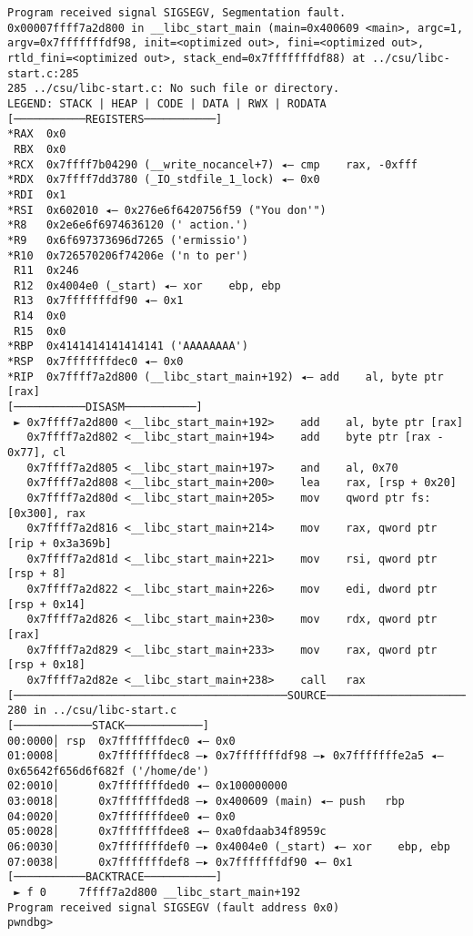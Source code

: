 \begin{lstlisting}
Program received signal SIGSEGV, Segmentation fault.
0x00007ffff7a2d800 in __libc_start_main (main=0x400609 <main>, argc=1, argv=0x7fffffffdf98, init=<optimized out>, fini=<optimized out>, rtld_fini=<optimized out>, stack_end=0x7fffffffdf88) at ../csu/libc-start.c:285
285	../csu/libc-start.c: No such file or directory.
LEGEND: STACK | HEAP | CODE | DATA | RWX | RODATA
[───────────REGISTERS───────────]
*RAX  0x0
 RBX  0x0
*RCX  0x7ffff7b04290 (__write_nocancel+7) ◂— cmp    rax, -0xfff
*RDX  0x7ffff7dd3780 (_IO_stdfile_1_lock) ◂— 0x0
*RDI  0x1
*RSI  0x602010 ◂— 0x276e6f6420756f59 ("You don'")
*R8   0x2e6e6f6974636120 (' action.')
*R9   0x6f697373696d7265 ('ermissio')
*R10  0x726570206f74206e ('n to per')
 R11  0x246
 R12  0x4004e0 (_start) ◂— xor    ebp, ebp
 R13  0x7fffffffdf90 ◂— 0x1
 R14  0x0
 R15  0x0
*RBP  0x4141414141414141 ('AAAAAAAA')
*RSP  0x7fffffffdec0 ◂— 0x0
*RIP  0x7ffff7a2d800 (__libc_start_main+192) ◂— add    al, byte ptr [rax]
[───────────DISASM───────────]
 ► 0x7ffff7a2d800 <__libc_start_main+192>    add    al, byte ptr [rax]
   0x7ffff7a2d802 <__libc_start_main+194>    add    byte ptr [rax - 0x77], cl
   0x7ffff7a2d805 <__libc_start_main+197>    and    al, 0x70
   0x7ffff7a2d808 <__libc_start_main+200>    lea    rax, [rsp + 0x20]
   0x7ffff7a2d80d <__libc_start_main+205>    mov    qword ptr fs:[0x300], rax
   0x7ffff7a2d816 <__libc_start_main+214>    mov    rax, qword ptr [rip + 0x3a369b]
   0x7ffff7a2d81d <__libc_start_main+221>    mov    rsi, qword ptr [rsp + 8]
   0x7ffff7a2d822 <__libc_start_main+226>    mov    edi, dword ptr [rsp + 0x14]
   0x7ffff7a2d826 <__libc_start_main+230>    mov    rdx, qword ptr [rax]
   0x7ffff7a2d829 <__libc_start_main+233>    mov    rax, qword ptr [rsp + 0x18]
   0x7ffff7a2d82e <__libc_start_main+238>    call   rax
[──────────────────────────────────────────SOURCE───────────────────────────────────────────]
280	in ../csu/libc-start.c
[────────────STACK────────────]
00:0000│ rsp  0x7fffffffdec0 ◂— 0x0
01:0008│      0x7fffffffdec8 —▸ 0x7fffffffdf98 —▸ 0x7fffffffe2a5 ◂— 0x65642f656d6f682f ('/home/de')
02:0010│      0x7fffffffded0 ◂— 0x100000000
03:0018│      0x7fffffffded8 —▸ 0x400609 (main) ◂— push   rbp
04:0020│      0x7fffffffdee0 ◂— 0x0
05:0028│      0x7fffffffdee8 ◂— 0xa0fdaab34f8959c
06:0030│      0x7fffffffdef0 —▸ 0x4004e0 (_start) ◂— xor    ebp, ebp
07:0038│      0x7fffffffdef8 —▸ 0x7fffffffdf90 ◂— 0x1
[───────────BACKTRACE───────────]
 ► f 0     7ffff7a2d800 __libc_start_main+192
Program received signal SIGSEGV (fault address 0x0)
pwndbg> 
\end{lstlisting}

